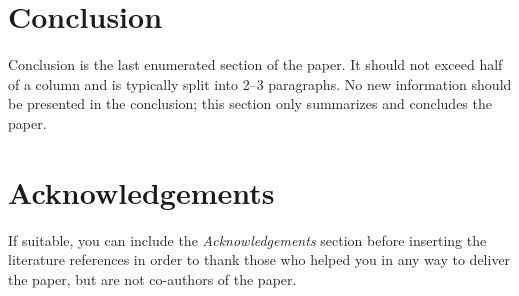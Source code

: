 \documentclass[10pt, a4paper]{article}
\begin{document}
\section{Conclusion}

Conclusion is the last enumerated section of the paper. It should not exceed half of a column and is typically split into 2--3 paragraphs. No new information should be presented in the conclusion; this section only summarizes and concludes the paper.

\section*{Acknowledgements}

If suitable, you can include the \textit{Acknowledgements} section before inserting the literature references  in order to thank those who helped you in any way to deliver the paper, but are not co-authors of the paper.

\nocite{kerz-etal-2022-pushing,zhang-etal-2023-psyattention,yang-etal-2023-psycot,v-ganesan-etal-2023-systematic}



\end{document}
